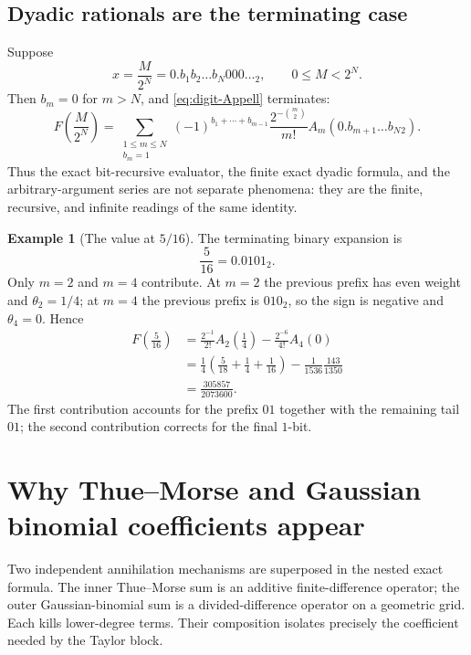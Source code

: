 \documentclass[11pt,oneside]{article}
\theoremstyle{definition}
\newtheorem{example}[theorem]{Example}
\theoremstyle{remark}
\begin{document}
\subsection{Dyadic rationals are the terminating case}

Suppose
\[
 x=\frac{M}{2^N}=0.b_1b_2\ldots b_N000\ldots{}_2,
 \qquad 0\le M<2^N.
\]
Then $b_m=0$ for $m>N$, and \eqref{eq:digit-Appell} terminates:
\begin{equation}\label{eq:dyadic-digit-Appell}
 \boxed{
 F\!\left(\frac{M}{2^N}\right)
 =\sum_{\substack{1\le m\le N\\b_m=1}}
 (-1)^{b_1+\cdots+b_{m-1}}
 \frac{2^{-\binom m2}}{m!}
 A_m\!\left(0.b_{m+1}\ldots b_N{}_2\right).}
\end{equation}
Thus the exact bit-recursive evaluator, the finite exact dyadic formula, and
the arbitrary-argument series are not separate phenomena: they are the finite,
recursive, and infinite readings of the same identity.

\begin{example}[The value at $5/16$]\label{ex:five-sixteen}
The terminating binary expansion is
\[
 \frac5{16}=0.0101_2.
\]
Only $m=2$ and $m=4$ contribute.  At $m=2$ the previous prefix has even
weight and $\theta_2=1/4$; at $m=4$ the previous prefix is $010_2$, so the
sign is negative and $\theta_4=0$.  Hence
\begin{align*}
 F\!\left(\frac5{16}\right)
 &=\frac{2^{-1}}{2!}A_2\!\left(\frac14\right)
   -\frac{2^{-6}}{4!}A_4(0)\\
 &=\frac14\left(\frac5{18}+\frac14+\frac1{16}\right)
   -\frac1{1536}\frac{143}{1350}\\
 &=\frac{305857}{2073600}.
\end{align*}
The first contribution accounts for the prefix $01$ together with the
remaining tail $01$; the second contribution corrects for the final $1$-bit.
\end{example}

\section{Why Thue--Morse and Gaussian binomial coefficients appear}

Two independent annihilation mechanisms are superposed in the nested exact
formula.  The inner Thue--Morse sum is an additive finite-difference operator;
the outer Gaussian-binomial sum is a divided-difference operator on a geometric
grid.  Each kills lower-degree terms.  Their composition isolates precisely
the coefficient needed by the Taylor block.
\end{document}
